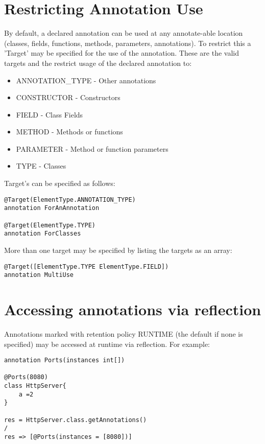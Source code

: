 \documentclass[conc-doc]{subfiles}
\begin{document}
\section{Restricting Annotation Use}
By default, a declared annotation can be used at any annotate-able location (classes, fields, functions, methods, parameters, annotations). To restrict this a 'Target' may be specified for the use of the annotation. These are the valid targets and the restrict usage of the declared annotation to:

\begin{itemize}
	\item ANNOTATION\_TYPE - Other annotations
	\item CONSTRUCTOR - Constructors
	\item FIELD - Class Fields
	\item METHOD - Methods or functions 
	\item PARAMETER - Method or function parameters
	\item TYPE - Classes
\end{itemize}

Target's can be specified as follows:

\begin{lstlisting}
@Target(ElementType.ANNOTATION_TYPE)
annotation ForAnAnnotation

@Target(ElementType.TYPE)
annotation ForClasses
\end{lstlisting}

More than one target may be specified by listing the targets as an array:

\begin{lstlisting}
@Target([ElementType.TYPE ElementType.FIELD])
annotation MultiUse
\end{lstlisting}

\section{Accessing annotations via reflection}
Annotations marked with retention policy RUNTIME (the default if none is specified) may be accessed at runtime via reflection. For example:

\begin{lstlisting}
annotation Ports(instances int[])

@Ports(8080)
class HttpServer{
	a =2
}

res = HttpServer.class.getAnnotations()
/
res => [@Ports(instances = [8080])]
\end{lstlisting}
\end{document}
